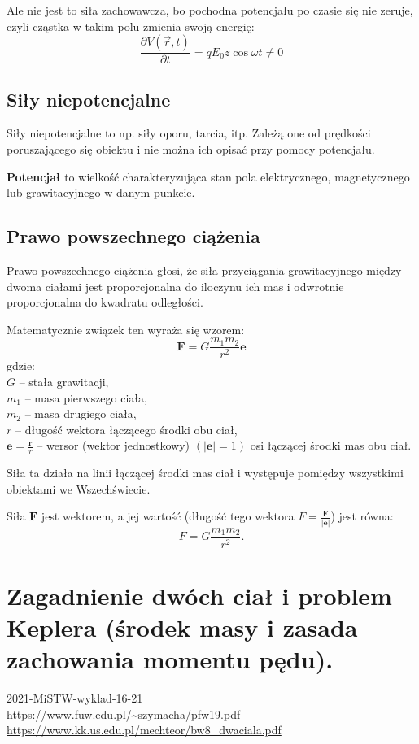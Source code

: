 \documentclass{article}
\begin{document}
Ale nie jest to siła zachowawcza, bo pochodna potencjału po czasie się nie zeruje, czyli cząstka w takim polu zmienia swoją energię:
\begin{equation*}
    \frac{\partial{V}(\vec r,t)}{\partial t}
= qE_0 z \cos\omega t \ne 0
\end{equation*}

\subsection{Siły niepotencjalne}
Siły niepotencjalne to np. siły oporu, tarcia, itp. Zależą one od prędkości poruszającego się obiektu i nie można ich opisać przy pomocy potencjału.

\textbf{Potencjał} to wielkość charakteryzująca stan pola elektrycznego, magnetycznego lub grawitacyjnego w danym punkcie.

\subsection{Prawo powszechnego ciążenia}
Prawo powszechnego ciążenia głosi, że siła przyciągania grawitacyjnego między dwoma ciałami jest proporcjonalna do iloczynu ich mas i odwrotnie proporcjonalna do kwadratu odległości.

Matematycznie związek ten wyraża się wzorem:
\begin{equation*}
    \boldsymbol F = G \frac{m_1 m_2}{r^2} \boldsymbol e
\end{equation*}
gdzie:\\
$G$ -- stała grawitacji,\\
$m_1$ -- masa pierwszego ciała,\\
$m_2$ -- masa drugiego ciała,\\
$r$ -- długość wektora łączącego środki obu ciał,\\
$\boldsymbol e=\frac{\boldsymbol r}{r}$ -- wersor (wektor jednostkowy) $(|\boldsymbol e| =1)$ osi łączącej środki mas obu ciał.

Siła ta działa na linii łączącej środki mas ciał i występuje pomiędzy wszystkimi obiektami we Wszechświecie.

Siła $\boldsymbol F$ jest wektorem, a jej wartość (długość tego wektora $F=\frac{\boldsymbol F} {|\boldsymbol e|}$) jest równa:
\begin{equation*}
    F = G \frac{m_1 m_2}{r^2}.
\end{equation*}


\section{Zagadnienie dwóch ciał i problem Keplera (środek masy i zasada zachowania momentu pędu).}
2021-MiSTW-wyklad-16-21 \\
\url{https://www.fuw.edu.pl/~szymacha/pfw19.pdf} \\
\url{https://www.kk.us.edu.pl/mechteor/bw8_dwaciala.pdf}
\end{document}
